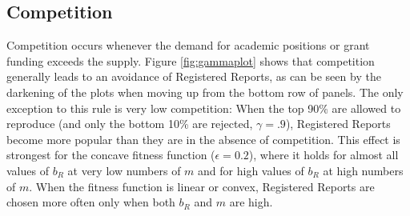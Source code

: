 \documentclass[
  ,man,mask,floatsintext]{apa6}
\begin{document}
\hypertarget{competition}{%
\subsection{Competition}\label{competition}}

Competition occurs whenever the demand for academic positions or grant funding exceeds the supply.
Figure \ref{fig:gammaplot} shows that competition generally leads to an avoidance of Registered Reports, as can be seen by the darkening of the plots when moving up from the bottom row of panels.
The only exception to this rule is very low competition:
When the top 90\% are allowed to reproduce (and only the bottom 10\% are rejected, \(\gamma = .9\)), Registered Reports become more popular than they are in the absence of competition.
This effect is strongest for the concave fitness function (\(\epsilon = 0.2\)), where it holds for almost all values of \(b_{R}\) at very low numbers of \(m\) and for high values of \(b_{R}\) at high numbers of \(m\).
When the fitness function is linear or convex, Registered Reports are chosen more often only when both \(b_{R}\) and \(m\) are high.
\end{document}
